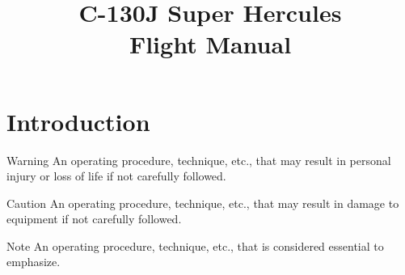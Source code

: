 \documentclass[
  parskip=half,
  paper=a4, 12pt, BCOR5mm, DIV14,
  footsepline, chapterprefix,
  abstract=true,
  headings=small,
  footinclude=false,
  headinclude=false,
  numbers=noenddot,
  captions=tableheading,
  listof=totoc
]{scrreprt}
\author{}
\title{C-130J Super Hercules \\
\large Flight Manual}
\begin{document}

\maketitle



\tableofcontents

\chapter{Introduction}

\begin{bclogo}[logo=\bcattention, ombre=false, couleurBarre=red, marge=18, noborder=true]{ Warning}
An operating procedure, technique, etc., that may result in personal injury or loss of life if not carefully followed.
\end{bclogo}

\begin{bclogo}[logo=\bctakecare, ombre=false, couleurBarre=orange, marge=18, noborder=true]{ Caution}
An operating procedure, technique, etc., that may result in damage to equipment if not carefully followed.
\end{bclogo}

\begin{bclogo}[logo=\bclampe, ombre=false, couleurBarre=blue, marge=18, noborder=true]{ Note}
An operating procedure, technique, etc., that is considered essential to emphasize.
\end{bclogo}




%
%



\makeatletter
\renewcommand*{\toclevel@chapter}{-1} %
\makeatother

\listoffigures

\renewcommand*{\acronymname}{List of Abbreviations/Acronyms}
\printglossary[toctitle={Abbreviations/Acronyms},style=indexgroup]
\end{document}
